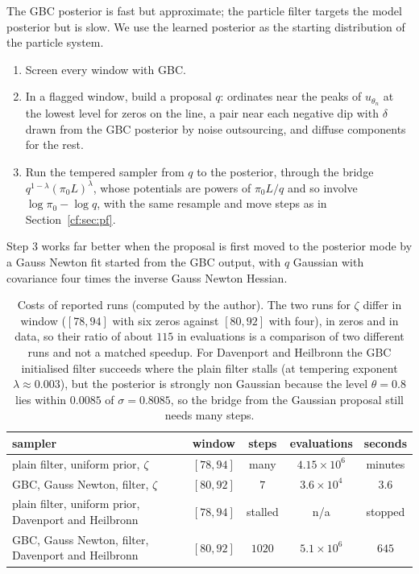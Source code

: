 The GBC posterior is fast but approximate; the particle filter targets the model posterior but is slow. We use the learned posterior as the starting distribution of the particle system.
\begin{enumerate}
\item Screen every window with GBC.
\item In a flagged window, build a proposal $q$: ordinates near the peaks of $u_{\theta_n}$ at the lowest level for zeros on the line, a pair near each negative dip with $\delta$ drawn from the GBC posterior by noise outsourcing, and diffuse components for the rest.
\item Run the tempered sampler from $q$ to the posterior, through the bridge $q^{1-\lambda}(\pi_0L)^\lambda$, whose potentials are powers of $\pi_0L/q$ and so involve $\log\pi_0-\log q$, with the same resample and move steps as in Section~\ref{cf:sec:pf}.
\end{enumerate}
Step 3 works far better when the proposal is first moved to the posterior mode by a Gauss Newton fit started from the GBC output, with $q$ Gaussian with covariance four times the inverse Gauss Newton Hessian.

\begin{table}[h]
\centering
\small\begin{tabular}{p{5.2cm}cccc}
\toprule
sampler & window & steps & evaluations & seconds\\
\midrule
plain filter, uniform prior, $\zeta$ & $[78,94]$ & many & $4.15\times10^6$ & minutes\\
GBC, Gauss Newton, filter, $\zeta$ & $[80,92]$ & $7$ & $3.6\times10^4$ & $3.6$\\
plain filter, uniform prior, Davenport and Heilbronn & $[78,94]$ & stalled & n/a & stopped\\
GBC, Gauss Newton, filter, Davenport and Heilbronn & $[80,92]$ & $1020$ & $5.1\times10^6$ & $645$\\
\bottomrule
\end{tabular}
\caption{Costs of reported runs (computed by the author). The two runs for $\zeta$ differ in window ($[78,94]$ with six zeros against $[80,92]$ with four), in zeros and in data, so their ratio of about $115$ in evaluations is a comparison of two different runs and not a matched speedup. For Davenport and Heilbronn the GBC initialised filter succeeds where the plain filter stalls (at tempering exponent $\lambda\approx0.003$), but the posterior is strongly non Gaussian because the level $\theta=0.8$ lies within $0.0085$ of $\sigma=0.8085$, so the bridge from the Gaussian proposal still needs many steps.}
\label{cf:tab:cost}
\end{table}


